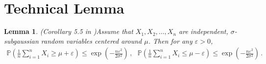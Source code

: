 \documentclass[letterpaper]{article} %
\newtheorem{lemma}{Lemma}
\newcommand{\bracket}[1]{\left(#1\right)}
\newcommand{\PP}[1]{\mathbb{P} \left(#1\right)}
\begin{document}
\section{Technical Lemma}


\begin{lemma}{(Corollary 5.5 in \cite{lattimore2020bandit})}\label{lem:chernoff}
Assume that $X_1, X_2,\ldots, X_n$ are independent, $\sigma$-subgaussian random variables centered around $\mu$. Then for any $\varepsilon > 0$,
\begin{align*}
    \PP{ \frac{1}{n} \sum_{i=1}^n X_i \ge  \mu + \varepsilon} \le \exp\bracket{-\frac{n\varepsilon^2}{2\sigma^2}}\,, \ \ \ \PP{ \frac{1}{n} \sum_{i=1}^n X_i \le  \mu - \varepsilon} \le \exp\bracket{-\frac{n\varepsilon^2}{2\sigma^2}}\,.
\end{align*}
\end{lemma}
\end{document}
